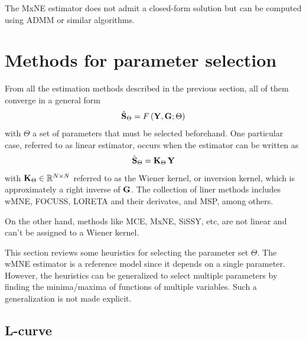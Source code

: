 The MxNE estimator does not admit a closed-form solution but can be computed using ADMM or similar algorithms.

\section{Methods for parameter selection}

From all the estimation methods described in the previous section, all of them converge in a general form
\begin{equation}
\hat{\mathbf{S}}_\Theta = F\left(  \mathbf{Y}, \mathbf{G}; \Theta  \right)
\end{equation}
with $\Theta$ a set of parameters that must be selected beforehand.
%
One particular case, referred to as linear estimator, occurs when the estimator can be written as
\begin{equation}
\hat{\mathbf{S}}_\Theta
=
\mathbf{K}_{\Theta}\, \mathbf{Y}
\end{equation}
with $\mathbf{K}_{\Theta} \in \mathbb{R}^{N\times N}$ referred to as the Wiener kernel, or inversion kernel, which is approximately a right inverse of $\mathbf{G}$.
%
The collection of liner methods includes wMNE, FOCUSS, LORETA and their derivates, and MSP, among others. 

On the other hand, methods like MCE, MxNE, SiSSY, etc, are not linear and can't be assigned to a Wiener kernel.

This section reviews some heuristics for selecting the parameter set $\Theta$.
%
The wMNE estimator is a reference model since it depends on a single parameter.
%
However, the heuristics can be generalized to select multiple parameters by finding the minima/maxima of functions of multiple variables.
%
Such a generalization is not made explicit.

\subsection{L-curve}

